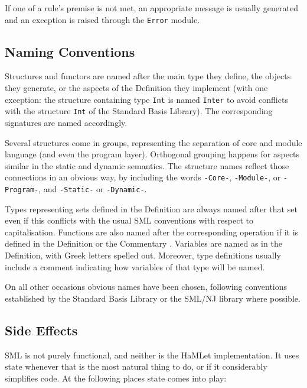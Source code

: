 \documentclass[twoside,titlepage]{article}
\begin{document}
If one of a rule's premise is not met, an appropriate message is usually generated and an exception is raised through the {\tt Error} module.


\subsection{Naming Conventions}
\label{naming}

Structures and functors are named after the main type they define, the objects they generate, or the aspects of the Definition they implement (with one exception: the structure containing type {\tt Int} is named {\tt Inter} to avoid conflicts with the structure {\tt Int} of the Standard Basis Library). The corresponding signatures are named accordingly.

Several structures come in groups, representing the separation of core and module language (and even the program layer). Orthogonal grouping happens for aspects similar in the static and dynamic semantics. The structure names reflect those connections in an obvious way, by including the words {\tt -Core-}, {\tt -Module-}, or {\tt -Program-}, and {\tt -Static-} or {\tt -Dynamic-}.

Types representing sets defined in the Definition are always named after that set even if this conflicts with the usual SML conventions with respect to capitalisation. Functions are also named after the corresponding operation if it is defined in the Definition or the Commentary \cite{commentary}. Variables are named as in the Definition, with Greek letters spelled out. Moreover, type definitions usually include a comment indicating how variables of that type will be named.

On all other occasions obvious names have been chosen, following conventions established by the Standard Basis Library \cite{basis} or the SML/NJ library \cite{njlib} where possible.


\subsection{Side Effects}
\label{sideeffects}

SML is not purely functional, and neither is the HaMLet implementation. It uses state whenever that is the most natural thing to do, or if it considerably simplifies code. At the following places state comes into play:
\end{document}
